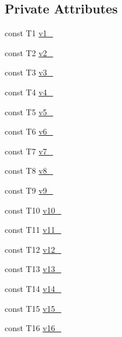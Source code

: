 \subsection*{\-Private \-Attributes}
\begin{DoxyCompactItemize}
\item 
const \-T1 \hyperlink{classtesting_1_1internal_1_1ValueArray16_aac1d0654cc6c1aceb4a5d0fa7a98042e}{v1\-\_\-}
\item 
const \-T2 \hyperlink{classtesting_1_1internal_1_1ValueArray16_a9f0a8ce6ce2fd27e980c4c51a7a7256a}{v2\-\_\-}
\item 
const \-T3 \hyperlink{classtesting_1_1internal_1_1ValueArray16_a4f8257321a2eab0456239174d6712d5e}{v3\-\_\-}
\item 
const \-T4 \hyperlink{classtesting_1_1internal_1_1ValueArray16_aac184059fee257381ccae81d8d112f85}{v4\-\_\-}
\item 
const \-T5 \hyperlink{classtesting_1_1internal_1_1ValueArray16_a1f3e0ada8419ed2e17cc61e6c0c54404}{v5\-\_\-}
\item 
const \-T6 \hyperlink{classtesting_1_1internal_1_1ValueArray16_a13d84d5824617bbc6fb1a6b3ee3cb745}{v6\-\_\-}
\item 
const \-T7 \hyperlink{classtesting_1_1internal_1_1ValueArray16_a4063f0b7a528133d018ee488ba44a9a3}{v7\-\_\-}
\item 
const \-T8 \hyperlink{classtesting_1_1internal_1_1ValueArray16_a596bc5260b2474271d1f6910ff6f665d}{v8\-\_\-}
\item 
const \-T9 \hyperlink{classtesting_1_1internal_1_1ValueArray16_a6356e16cf54a9dfac8525f20242af31e}{v9\-\_\-}
\item 
const \-T10 \hyperlink{classtesting_1_1internal_1_1ValueArray16_a147ca4457ea439b00a93087231ff77ef}{v10\-\_\-}
\item 
const \-T11 \hyperlink{classtesting_1_1internal_1_1ValueArray16_a12a4baf9ab57c7e9b5b4f1612e59e529}{v11\-\_\-}
\item 
const \-T12 \hyperlink{classtesting_1_1internal_1_1ValueArray16_a35ffe6d4d723857722ab319a235eddfc}{v12\-\_\-}
\item 
const \-T13 \hyperlink{classtesting_1_1internal_1_1ValueArray16_a8c6e803e306975fc3ed6717875688efa}{v13\-\_\-}
\item 
const \-T14 \hyperlink{classtesting_1_1internal_1_1ValueArray16_a812dbcac0513d6c5242ff4df1b8da6dd}{v14\-\_\-}
\item 
const \-T15 \hyperlink{classtesting_1_1internal_1_1ValueArray16_ab34fb63edf7d2b53ddbf7ac163123da0}{v15\-\_\-}
\item 
const \-T16 \hyperlink{classtesting_1_1internal_1_1ValueArray16_a8b2b80d31925c1583c3e694d2bf235c5}{v16\-\_\-}
\end{DoxyCompactItemize}


